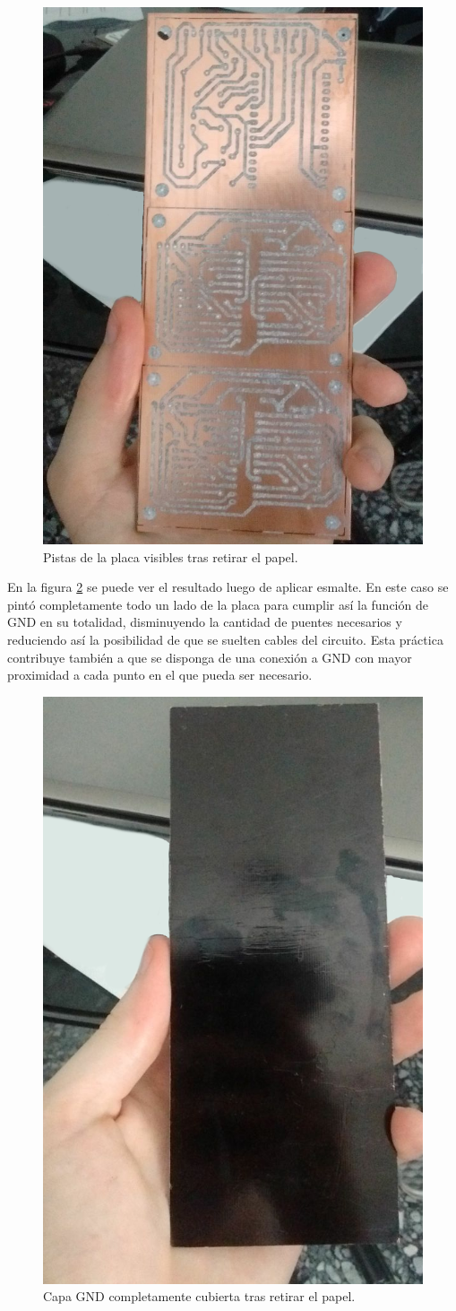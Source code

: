 \begin{figure}[ht!]
	\centering
	\includegraphics[width=0.47\linewidth]{imagenes/pcbeando/pos-sacado-pape-1.png}
	\caption{Pistas de la placa visibles tras retirar el papel.}
	\label{fig:pos-sacado-papel-1}
\end{figure}

En la figura \ref{fig:pos-sacado-papel-2} se puede ver el resultado luego de aplicar esmalte. En este caso se pintó completamente todo un lado de la placa para cumplir así la función de GND en su totalidad, disminuyendo la cantidad de puentes necesarios y reduciendo así la posibilidad de que se suelten cables del circuito. Esta práctica contribuye también a que se disponga de una conexión a GND con mayor proximidad a cada punto en el que pueda ser necesario. 

\begin{figure}[ht!]
	\centering
	\includegraphics[width=0.47\linewidth]{imagenes/pcbeando/pos-sacado-papel-2.png}
	\caption{Capa GND completamente cubierta tras retirar el papel.}
	\label{fig:pos-sacado-papel-2}
\end{figure}



